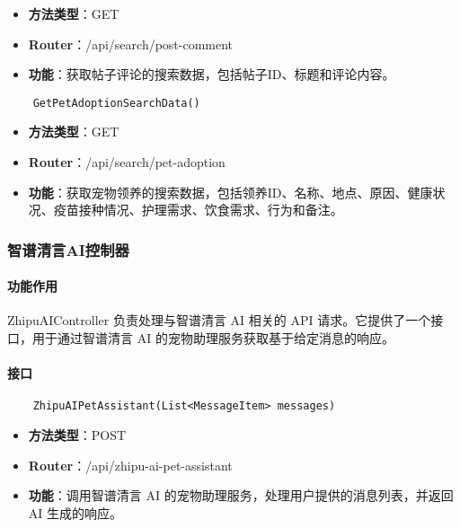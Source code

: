 \begin{itemize}
	\item \textbf{方法类型}：GET
	\item \textbf{Router}：/api/search/post-comment
	\item \textbf{功能}：获取帖子评论的搜索数据，包括帖子ID、标题和评论内容。
\end{itemize}

\begin{verbatim}
	GetPetAdoptionSearchData()
\end{verbatim}

\begin{itemize}
	\item \textbf{方法类型}：GET
	\item \textbf{Router}：/api/search/pet-adoption
	\item \textbf{功能}：获取宠物领养的搜索数据，包括领养ID、名称、地点、原因、健康状况、疫苗接种情况、护理需求、饮食需求、行为和备注。
\end{itemize}

\subsubsection{智谱清言AI控制器}

\paragraph{功能作用}

ZhipuAIController 负责处理与智谱清言 AI 相关的 API 请求。它提供了一个接口，用于通过智谱清言 AI 的宠物助理服务获取基于给定消息的响应。

\paragraph{接口}

\begin{verbatim}
	ZhipuAIPetAssistant(List<MessageItem> messages)
\end{verbatim}

\begin{itemize}
	\item \textbf{方法类型}：POST
	\item \textbf{Router}：/api/zhipu-ai-pet-assistant
	\item \textbf{功能}：调用智谱清言 AI 的宠物助理服务，处理用户提供的消息列表，并返回 AI 生成的响应。
\end{itemize}
